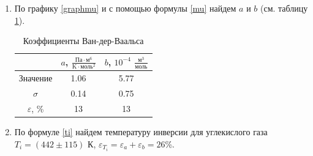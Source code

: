 \documentclass[12pt]{article}
\begin{document}
\begin{enumerate}
        \item По графику \ref{graphmu} и с помощью формулы \ref{mu} найдем $a$ и $b$ 
        (см. таблицу \ref{tabcoeffs}).
        \begin{table}[h]
            \centering
            \begin{tabular}{|c|c|c|}
            \hline
              & $a$, $\frac{\text{Па}\cdot\text{м}^6}{\text{K}\cdot\text{моль}^2}$    & $b$, $10^{-4}$ $\frac{\text{м}^3}{\text{моль}}$    \\ \hline
            Значение & 1.06 & 5.77 \\ \hline
            $\sigma$ & 0.14 & 0.75 \\ \hline
            $\varepsilon$, \% & 13   & 13   \\ \hline
            \end{tabular}
            \caption{Коэффициенты Ван-дер-Ваальса}
            \label{tabcoeffs}
        \end{table}
        
        \item По формуле \ref{ti} найдем температуру инверсии для углекислого
        газа $T_i = (442\pm115)$ К, $\varepsilon_{T_i} = \varepsilon_a + \varepsilon_b = 26$\%.
    \end{enumerate}
\end{document}

